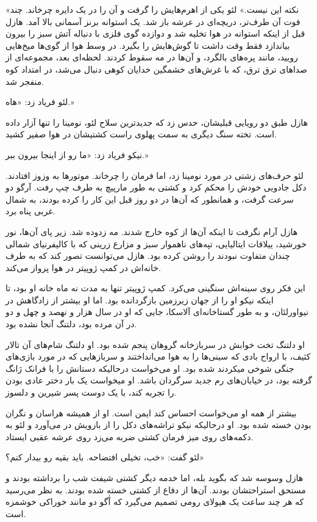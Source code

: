 \documentclass{book}
\begin{document}
«نکته این نیست.» لئو یکی از اهرم‌هایش را گرفت و آن را در یک دایره چرخاند. چند فوت آن طرف‌تر، دریچه‌ای در عرشه باز شد. یک استوانه برنز آسمانی بالا آمد. هازل قبل از اینکه استوانه در هوا تخلیه شد و دوازده گوی فلزی با دنباله آتش سبز را بیرون بیاندازد فقط وقت داشت تا گوش‌هایش را بگیرد. در وسط هوا از گوی‌ها میخ‌هایی رویید، مانند پره‌های بالگرد، و آن‌ها در مه سقوط کردند. لحظه‌ای بعد، مجموعه‌ای از صداهای ترق ترق، که با غرش‌های خشمگین خدایان کوهی دنبال می‌شد، در امتداد کوه منفجر شد.

لئو فریاد زد: «هاه.»

هازل طبق دو رویایی قبلیشان، حدس زد که جدیدترین سلاح لئو، نومینا را تنها آزار داده است. تخته سنگ دیگری به سمت پهلوی راست کشتیشان در هوا صفیر کشید.

نیکو فریاد زد: «ما رو از اینجا بیرون ببر.»

لئو حرف‌های زشتی در مورد نومینا زد، اما فرمان را چرخاند. موتورها به وزوز افتادند. دکل جادویی خودش را محکم کرد و کشتی به طور مارپیچ به طرف چپ رفت. آرگو دو سرعت گرفت، و همانطور که آن‌ها در دو روز قبل این کار را کرده بودند، به شمال غربی پناه برد.

هازل آرام نگرفت تا اینکه آن‌ها از کوه خارج شدند. مه زدوده شد. زیر پای آن‌ها، نور خورشید، ییلاقات ایتالیایی، تپه‌های ناهموار سبز و مزارع زرینی که با کالیفرنیای شمالی چندان متفاوت نبودند را روشن کرده بود. هازل می‌توانست تصور کند که به طرف خانه‌اش در کمپ ژوپیتر در هوا پرواز می‌کند.

این فکر روی سینه‌اش سنگینی می‌کرد. کمپ ژوپیتر تنها به مدت نه ماه خانه او بود، تا اینکه نیکو او را از جهان زیرزمین بازگردانده بود. اما او بیشتر از زادگاهش در نیواورلئان، و به طور گستاخانه‌ای آلاسکا، جایی که او در سال هزار و نهصد و چهل و دو در آن مرده بود، دلتنگ آنجا نشده بود.

او دلتنگ تخت خوابش در سربازخانه گروهان پنجم شده بود. او دلتنگ شام‌های آن تالار کثیف، با ارواح بادی که سینی‌ها را به هوا می‌انداختند و سربازهایی که در مورد بازی‌های جنگی شوخی میکردند شده بود. او می‌خواست درحالیکه دستانش را با فرانک ژانگ گرفته بود، در خیابان‌های رم جدید سرگردان باشد. او میخواست یک بار دختر عادی بودن را تجربه کند، با یک دوست پسر شیرین و دلسوز.

بیشتر از همه او می‌خواست احساس کند ایمن است. او از همیشه هراسان و نگران بودن خسته شده بود.
او درحالیکه نیکو تراشه‌های دکل را از بازویش در می‌آورد و لئو به دکمه‌‌های روی میز فرمان کشتی ضربه می‌زد روی عرشه عقبی ایستاد.

لئو گفت: «خب، تخیلی افتضاحه. باید بقیه رو بیدار کنم؟»

هازل وسوسه شد که بگوید بله، اما خدمه دیگر کشتی شیفت شب را برداشته بودند و مستحق استراحتشان بودند. آن‌ها از دفاع از کشتی خسته شده بودند. به نظر می‌رسید که هر چند ساعت یک هیولای رومی تصمیم می‌گیرد که آٰگو دو مانند خوراکی خوشمزه است.
\end{document}
